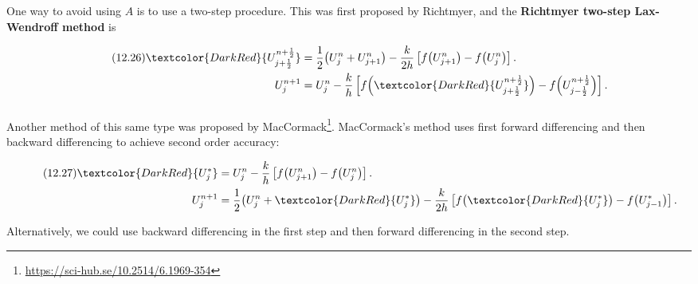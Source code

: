 \begin{frame}
  One way to avoid using $A$ is to use a two-step procedure.
  This was first proposed by Richtmyer, and the
  \textbf{Richtmyer two-step Lax-Wendroff method} is

  \begin{align}\tag{12.26}\label{eq:12.26}
    \textcolor{DarkRed}{
      U_{j+\frac{1}{2}}^{n+\frac{1}{2}}
    }           & =
    \frac{1}{2}
    \big(
    U^{n}_{j}+
    U^{n}_{j+1}
    \big)-
    \frac{k}{2h}
    \left[
      f
      \big(U^{n}_{j+1}\big)-
      f
      \big(U^{n}_{j}\big)
    \right].        \\
    \notag
    U^{n+1}_{j} & =
    U_{j}^{n}-
    \frac{k}{h}
    \left[
      f
      \Big(
      \textcolor{DarkRed}{U_{j+\frac{1}{2}}^{n+\frac{1}{2}}}
      \Big)-
      f
      \Big(
      U_{j-\frac{1}{2}}^{n+\frac{1}{2}}
      \Big)
      \right].
  \end{align}
\end{frame}

\begin{frame}
  \frametitle{\secname}

  Another method of this same type was proposed by
  MacCormack\footnote{\url{https://sci-hub.se/10.2514/6.1969-354}}.
  MacCormack's method uses first forward differencing and then
  backward differencing to achieve second order accuracy:

  \begin{align}\tag{12.27}\label{eq:12.27}
    \textcolor{DarkRed}{U_{j}^{\ast}} & =
    U_{j}^{n}-
    \frac{k}{h}
    \left[
      f\big(U^{n}_{j+1}\big)-
      f\big(U^{n}_{j}\big)
    \right].                              \\
    \notag
    U^{n+1}_{j}                       & =
    \frac{1}{2}
    \big(
    U^{n}_{j}+
    \textcolor{DarkRed}{U_{j}^{\ast}}
    \big)-
    \frac{k}{2h}
    \left[
      f
      \big(\textcolor{DarkRed}{U_{j}^{\ast}}\big)-
      f
      \big(U^{\ast}_{j-1}\big)
      \right].
  \end{align}

  Alternatively, we could use backward differencing in the first step
  and then forward differencing in the second step.
\end{frame}